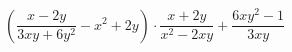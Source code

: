 \begin{ex}[type=expression]
	\begin{condition}
		\( \left( \dfrac{x-2y}{3xy+6y^2}-x^2+2y \right) \cdot\dfrac{x+2y}{x^2-2xy}+\dfrac{6xy^2-1}{3xy}\)
	\end{condition}
\end{ex}